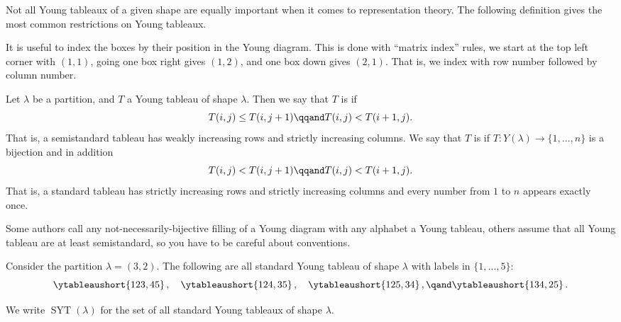 \documentclass[fleqn]{NotesClass}
\DeclareMathOperator{\standardYoungTableaux}{SYT}
\begin{document}
    Not all Young tableaux of a given shape are equally important when it comes to representation theory.
    The following definition gives the most common restrictions on Young tableaux.
    
    It is useful to index the boxes by their position in the Young diagram.
    This is done with \enquote{matrix index} rules, we start at the top left corner with \((1, 1)\), going one box right gives \((1, 2)\), and one box down gives \((2, 1)\).
    That is, we index with row number followed by column number.
    
    \begin{dfn}{}{}
        Let \(\lambda\) be a partition, and \(T\) a Young tableau of shape \(\lambda\).
        Then we say that \(T\) is  if
        \begin{equation}
            T(i, j) \le T(i, j + 1) \qqand T(i, j) < T(i + 1, j).
        \end{equation}
        That is, a semistandard tableau has weakly increasing rows and strictly increasing columns.
        We say that \(T\) is  if \(T \colon Y(\lambda) \to \{1, \dotsc, n\}\) is a bijection and in addition
        \begin{equation}
            T(i, j) < T(i, j + 1) \qqand T(i, j) < T(i + 1, j).
        \end{equation}
        That is, a standard tableau has strictly increasing rows and strictly increasing columns and every number from \(1\) to \(n\) appears exactly once.
    \end{dfn}
    
    \begin{rmk}
        Some authors call any not-necessarily-bijective filling of a Young diagram with any alphabet a Young tableau, others assume that all Young tableau are at least semistandard, so you have to be careful about conventions.
    \end{rmk}
    
    Consider the partition \(\lambda = (3,2)\).
    The following are all standard Young tableau of shape \(\lambda\) with labels in \(\{1, \dotsc, 5\}\):
    \begin{equation}
        \ytableaushort{123,45}\,,\quad \ytableaushort{124,35}\,,\quad \ytableaushort{125,34}\,,\qand\ytableaushort{134,25}\,.
    \end{equation}
    
    \begin{ntn}{}{}
        We write \(\standardYoungTableaux(\lambda)\) for the set of all standard Young tableaux of shape \(\lambda\).
    \end{ntn}
    
\end{document}
